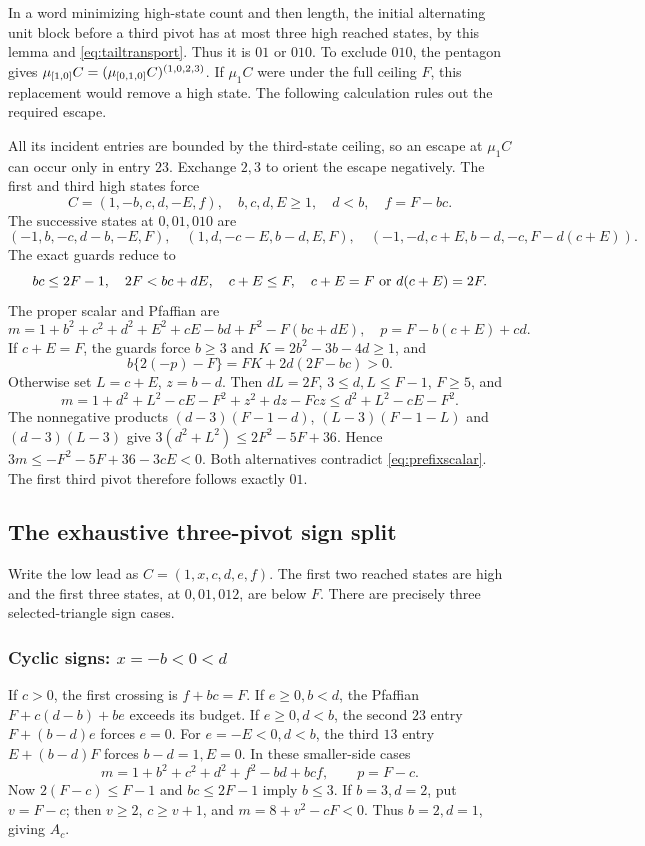 In a word minimizing high-state count and then length, the initial alternating unit block before a third pivot has at most three high reached states, by this lemma and \eqref{eq:tailtransport}. Thus it is $01$ or $010$. To exclude $010$, the pentagon gives
$\mu_{[1,0]}C=(\mu_{[0,1,0]}C)^{(1,0,2,3)}$. If $\mu_1C$ were under the full ceiling $F$, this replacement would remove a high state. The following calculation rules out the required escape.

All its incident entries are bounded by the third-state ceiling, so an escape at $\mu_1C$ can occur only in entry $23$. Exchange $2,3$ to orient the escape negatively. The first and third high states force
\[
 C=(1,-b,c,d,-E,f),\quad b,c,d,E\ge1,\quad d<b,\quad f=F-bc.
\]
The successive states at $0,01,010$ are
\[
 (-1,b,-c,d-b,-E,F),\quad(1,d,-c-E,b-d,E,F),\quad
 (-1,-d,c+E,b-d,-c,F-d(c+E)).
\]
The exact guards reduce to
\[
 bc\le2F-1,\quad2F<bc+dE,\quad c+E\le F,\quad
 c+E=F\ \hbox{or}\ d(c+E)=2F.
\]
The proper scalar and Pfaffian are
\[
 m=1+b^2+c^2+d^2+E^2+cE-bd+F^2-F(bc+dE),\quad p=F-b(c+E)+cd.
\]
If $c+E=F$, the guards force $b\ge3$ and $K=2b^2-3b-4d\ge1$, and
\[
 b\{2(-p)-F\}=FK+2d(2F-bc)>0.
\]
Otherwise set $L=c+E$, $z=b-d$. Then $dL=2F$, $3\le d,L\le F-1$, $F\ge5$, and
\[
 m=1+d^2+L^2-cE-F^2+z^2+dz-Fcz\le d^2+L^2-cE-F^2.
\]
The nonnegative products $(d-3)(F-1-d)$, $(L-3)(F-1-L)$ and $(d-3)(L-3)$ give $3(d^2+L^2)\le2F^2-5F+36$. Hence $3m\le-F^2-5F+36-3cE<0$. Both alternatives contradict \eqref{eq:prefixscalar}. The first third pivot therefore follows exactly $01$.

\subsection{The exhaustive three-pivot sign split}\label{app:signs}
Write the low lead as $C=(1,x,c,d,e,f)$. The first two reached states are high and the first three states, at $0,01,012$, are below $F$. There are precisely three selected-triangle sign cases.

\subsubsection{Cyclic signs: $x=-b<0<d$}
If $c>0$, the first crossing is $f+bc=F$. If $e\ge0,b<d$, the Pfaffian $F+c(d-b)+be$ exceeds its budget. If $e\ge0,d<b$, the second $23$ entry $F+(b-d)e$ forces $e=0$. For $e=-E<0,d<b$, the third $13$ entry $E+(b-d)F$ forces $b-d=1,E=0$. In these smaller-side cases
\[
 m=1+b^2+c^2+d^2+f^2-bd+bcf,\qquad p=F-c.
\]
Now $2(F-c)\le F-1$ and $bc\le2F-1$ imply $b\le3$. If $b=3,d=2$, put $v=F-c$; then $v\ge2$, $c\ge v+1$, and $m=8+v^2-cF<0$. Thus $b=2,d=1$, giving $A_c$.

